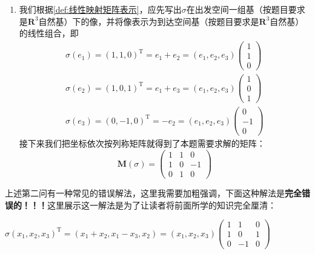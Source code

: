 \begin{solution}
\begin{enumerate}
        \item 我们根据\autoref{def:线性映射矩阵表示}，应先写出$\sigma$在出发空间一组基（按题目要求是$\mathbf{R}^3$自然基）下的像，并将像表示为到达空间基（按题目要求是$\mathbf{R}^3$自然基）的线性组合，即
            \begin{gather*}
                \sigma(e_1) = (1,1,0)^{\mathrm{T}}
                =e_1+e_2=(e_1,e_2,e_3)\begin{pmatrix}
                    1 \\ 1 \\ 0
                \end{pmatrix} \\
                \sigma(e_2) = (1,0,1)^{\mathrm{T}}
                =e_1+e_3=(e_1,e_2,e_3)\begin{pmatrix}
                    1 \\ 0 \\ 1
                \end{pmatrix} \\
                \sigma(e_3) = (0,-1,0)^{\mathrm{T}}
                =-e_2=(e_1,e_2,e_3)\begin{pmatrix}
                    0 \\ -1 \\ 0
                \end{pmatrix}
            \end{gather*}
            接下来我们把坐标依次按列称矩阵就得到了本题需要求解的矩阵：
            \[
                \mathbf{M}(\sigma)=\begin{pmatrix}
                    1 & 1 & 0  \\
                    1 & 0 & -1 \\
                    0 & 1 & 0
                \end{pmatrix}
            \]
    \end{enumerate}
\end{solution}

上述第二问有一种常见的错误解法，这里我需要加粗强调，下面这种解法是\textbf{完全错误的！！！}这里展示这一解法是为了让读者将前面所学的知识完全厘清：

\begin{solution}[错误解法！！！]
    $
        \sigma(x_1,x_2,x_3)^{\mathrm{T}}
        =(x_1+x_2,x_1-x_3, x_2)=(x_1,x_2,x_3)\begin{pmatrix}
            1 & 1  & 0 \\
            1 & 0  & 1 \\
            0 & -1 & 0
        \end{pmatrix}
    $
\end{solution}

